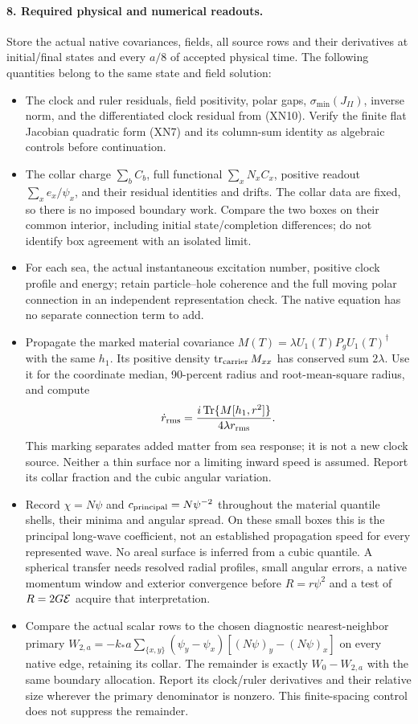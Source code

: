 \documentclass[11pt]{article}
\DeclareMathOperator{\Tr}{Tr}
\DeclareMathOperator{\tr}{tr}
\begin{document}
\paragraph{8. Required physical and numerical readouts.}
Store the actual native covariances, fields, all source rows and
their derivatives at initial/final states and every $a/8$ of
accepted physical time.  The following quantities belong to the
same state and field solution:
\begin{itemize}
\item The clock and ruler residuals, field positivity, polar gaps,
$\sigma_{\min}(J_{II})$, inverse norm, and the differentiated
clock residual from (XN10).  Verify the finite flat Jacobian
quadratic form (XN7) and its column-sum identity as algebraic
controls before continuation.
\item The collar charge $\sum_b C_b$, full functional
$\sum_xN_xC_x$, positive readout $\sum_x e_x/\psi_x$, and their
residual identities and drifts.  The collar data are fixed, so
there is no imposed boundary work.  Compare the two boxes on
their common interior, including initial state/completion
differences; do not identify box agreement with an isolated limit.
\item For each sea, the actual instantaneous excitation number,
positive clock profile and energy; retain particle--hole
coherence and the full moving polar connection in an independent
representation check.  The native equation has no separate
connection term to add.
\item Propagate the marked material covariance
$M(T)=\lambda U_1(T)P_gU_1(T)^\dagger$ with the same $h_1$.
Its positive density $\tr_{\rm carrier}M_{xx}$ has conserved sum
$2\lambda$.  Use it for the coordinate median, 90-percent
radius and root-mean-square radius, and compute
\[
 \dot r_{\rm rms}
   =\frac{i\Tr\{M[h_1,r^2]\}}
                {4\lambda r_{\rm rms}} .
\]
This marking separates added matter from sea response; it is
not a new clock source.  Neither a thin surface nor a limiting
inward speed is assumed.  Report its collar fraction and the
cubic angular variation.
\item Record $\chi=N\psi$ and $c_{\rm principal}=N\psi^{-2}$
throughout the material quantile shells, their minima and angular
spread.  On these small boxes this is the principal long-wave
coefficient, not an established propagation speed for every
represented wave.  No areal surface is inferred from a cubic
quantile.  A spherical transfer needs resolved radial profiles,
small angular errors, a native momentum window and exterior
convergence before $R=r\psi^2$ and a test of $R=2G{\cal E}$ acquire
that interpretation.
\item Compare the actual scalar rows to the chosen diagnostic
nearest-neighbor primary
$W_{2,a}=-k_*a\sum_{\{x,y\}}(\psi_y-\psi_x)
[(N\psi)_y-(N\psi)_x]$ on every native edge, retaining its collar.
The remainder is exactly $W_0-W_{2,a}$ with the same boundary
allocation.  Report its clock/ruler derivatives and their
relative size wherever the primary denominator is nonzero.
This finite-spacing control does not suppress the remainder.
\end{itemize}
\end{document}
